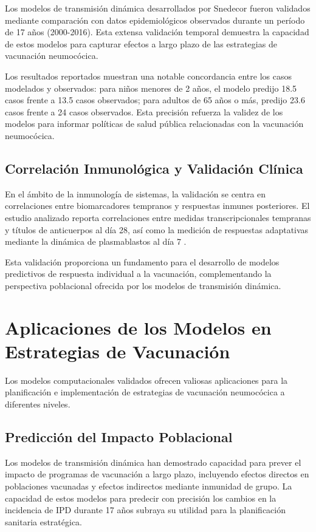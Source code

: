 Los modelos de transmisión dinámica desarrollados por Snedecor \cite{Snedecor2020a} fueron validados mediante comparación con datos epidemiológicos observados durante un período de 17 años (2000-2016). Esta extensa validación temporal demuestra la capacidad de estos modelos para capturar efectos a largo plazo de las estrategias de vacunación neumocócica.

Los resultados reportados muestran una notable concordancia entre los casos modelados y observados: para niños menores de 2 años, el modelo predijo 18.5 casos frente a 13.5 casos observados; para adultos de 65 años o más, predijo 23.6 casos frente a 24 casos observados. Esta precisión refuerza la validez de los modelos para informar políticas de salud pública relacionadas con la vacunación neumocócica.

\subsection{Correlación Inmunológica y Validación Clínica}

En el ámbito de la inmunología de sistemas, la validación se centra en correlaciones entre biomarcadores tempranos y respuestas inmunes posteriores. El estudio analizado reporta correlaciones entre medidas transcripcionales tempranas y títulos de anticuerpos al día 28, así como la medición de respuestas adaptativas mediante la dinámica de plasmablastos al día 7 \cite{Obermoser2013}.

Esta validación proporciona un fundamento para el desarrollo de modelos predictivos de respuesta individual a la vacunación, complementando la perspectiva poblacional ofrecida por los modelos de transmisión dinámica.

\section{Aplicaciones de los Modelos en Estrategias de Vacunación}

Los modelos computacionales validados ofrecen valiosas aplicaciones para la planificación e implementación de estrategias de vacunación neumocócica a diferentes niveles.

\subsection{Predicción del Impacto Poblacional}

Los modelos de transmisión dinámica han demostrado capacidad para prever el impacto de programas de vacunación a largo plazo, incluyendo efectos directos en poblaciones vacunadas y efectos indirectos mediante inmunidad de grupo. La capacidad de estos modelos para predecir con precisión los cambios en la incidencia de IPD durante 17 años subraya su utilidad para la planificación sanitaria estratégica.

